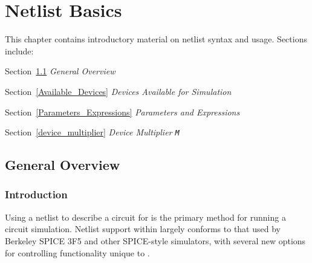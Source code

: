 


\chapter{Netlist Basics}
\label{Netlist_Basics}

{
This chapter contains introductory material on netlist syntax and usage.
Sections include:
\begin{XyceItemize}
\item Section~\ref{General_Overview} \emph{General Overview}
\item Section~\ref{Available_Devices} \emph{Devices Available for Simulation}
\item Section~\ref{Parameters_Expressions} \emph{Parameters and Expressions}
\item Section~\ref{device_multiplier} \emph{Device Multiplier \texttt{M}}
\end{XyceItemize}
}

\section{General Overview}
\label{General_Overview}

\subsection{Introduction}

Using a netlist to describe a circuit for \Xyce{} is the primary method for running a circuit
simulation.  Netlist support within \Xyce{}
largely conforms to that used by Berkeley SPICE 3F5 and other SPICE-style simulators, with
several new options for controlling functionality unique to \Xyce{}.

